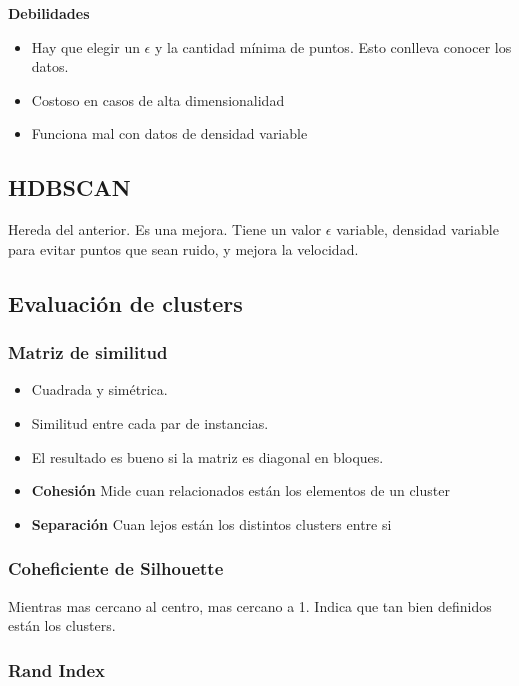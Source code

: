 \documentclass[titlepage,a4paper]{article}
\begin{document}
\textbf{Debilidades}
\begin{itemize}
    \item Hay que elegir un $\epsilon$ y la cantidad mínima de puntos. Esto conlleva conocer los datos.
    \item Costoso en casos de alta dimensionalidad
    \item Funciona mal con datos de densidad variable
\end{itemize}

\subsection{HDBSCAN}
Hereda del anterior. Es una mejora. Tiene un valor $\epsilon$ variable, densidad variable para evitar puntos que sean ruido, y mejora la velocidad.

\subsection{Evaluación de clusters}

\subsubsection{Matriz de similitud}

\begin{itemize}
    \item Cuadrada y simétrica.
    \item Similitud entre cada par de instancias.
    \item El resultado es bueno si la matriz es diagonal en bloques.
    \item \textbf{Cohesión} Mide cuan relacionados están los elementos de un cluster
    \item \textbf{Separación} Cuan lejos están los distintos clusters entre si %
\end{itemize}

\subsubsection{Coheficiente de Silhouette}
Mientras mas cercano al centro, mas cercano a 1. Indica que tan bien definidos están los clusters.



\subsubsection{Rand Index}
\end{document}
